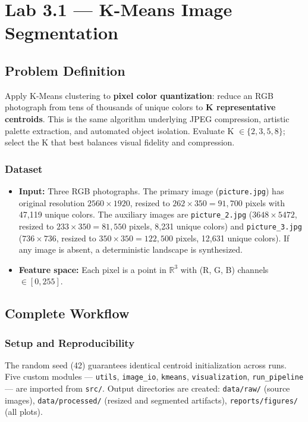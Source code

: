 \chapter{Lab 3.1 — K-Means Image Segmentation}
\label{ch:lab31}

\section{Problem Definition}

\begin{problembox}
Apply K-Means clustering to \textbf{pixel color quantization}: reduce an RGB photograph from tens of thousands of unique colors to \textbf{K representative centroids}. This is the same algorithm underlying JPEG compression, artistic palette extraction, and automated object isolation. Evaluate K $\in \{2, 3, 5, 8\}$; select the K that best balances visual fidelity and compression.
\end{problembox}

\subsection{Dataset}
\begin{itemize}
  \item \textbf{Input:} Three RGB photographs. The primary image (\texttt{picture.jpg}) has original resolution $2560\times1920$, resized to $262\times350 = 91{,}700$ pixels with 47{,}119 unique colors. The auxiliary images are \texttt{picture\_2.jpg} ($3648\times5472$, resized to $233\times350 = 81{,}550$ pixels, 8{,}231 unique colors) and \texttt{picture\_3.jpg} ($736\times736$, resized to $350\times350 = 122{,}500$ pixels, 12{,}631 unique colors). If any image is absent, a deterministic landscape is synthesized.
  \item \textbf{Feature space:} Each pixel is a point in $\mathbb{R}^3$ with (R, G, B) channels $\in [0, 255]$.
\end{itemize}

\section{Complete Workflow}

\subsection{Setup and Reproducibility}
The random seed (42) guarantees identical centroid initialization across runs. Five custom modules — \texttt{utils}, \texttt{image\_io}, \texttt{kmeans}, \texttt{visualization}, \texttt{run\_pipeline} — are imported from \texttt{src/}. Output directories are created: \texttt{data/raw/} (source images), \texttt{data/processed/} (resized and segmented artifacts), \texttt{reports/figures/} (all plots).

